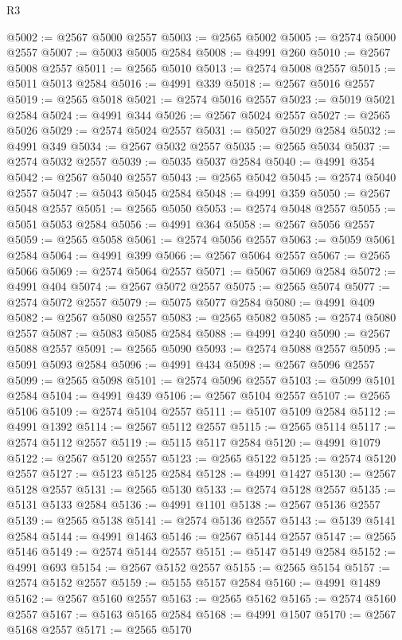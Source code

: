 \begin{lexlean}{R3}
\begin{coremodule}
@5002 := @2567 @5000 @2557
@5003 := @2565 @5002
@5005 := @2574 @5000 @2557
@5007 := @5003 @5005 @2584
@5008 := @4991 @260
@5010 := @2567 @5008 @2557
@5011 := @2565 @5010
@5013 := @2574 @5008 @2557
@5015 := @5011 @5013 @2584
@5016 := @4991 @339
@5018 := @2567 @5016 @2557
@5019 := @2565 @5018
@5021 := @2574 @5016 @2557
@5023 := @5019 @5021 @2584
@5024 := @4991 @344
@5026 := @2567 @5024 @2557
@5027 := @2565 @5026
@5029 := @2574 @5024 @2557
@5031 := @5027 @5029 @2584
@5032 := @4991 @349
@5034 := @2567 @5032 @2557
@5035 := @2565 @5034
@5037 := @2574 @5032 @2557
@5039 := @5035 @5037 @2584
@5040 := @4991 @354
@5042 := @2567 @5040 @2557
@5043 := @2565 @5042
@5045 := @2574 @5040 @2557
@5047 := @5043 @5045 @2584
@5048 := @4991 @359
@5050 := @2567 @5048 @2557
@5051 := @2565 @5050
@5053 := @2574 @5048 @2557
@5055 := @5051 @5053 @2584
@5056 := @4991 @364
@5058 := @2567 @5056 @2557
@5059 := @2565 @5058
@5061 := @2574 @5056 @2557
@5063 := @5059 @5061 @2584
@5064 := @4991 @399
@5066 := @2567 @5064 @2557
@5067 := @2565 @5066
@5069 := @2574 @5064 @2557
@5071 := @5067 @5069 @2584
@5072 := @4991 @404
@5074 := @2567 @5072 @2557
@5075 := @2565 @5074
@5077 := @2574 @5072 @2557
@5079 := @5075 @5077 @2584
@5080 := @4991 @409
@5082 := @2567 @5080 @2557
@5083 := @2565 @5082
@5085 := @2574 @5080 @2557
@5087 := @5083 @5085 @2584
@5088 := @4991 @240
@5090 := @2567 @5088 @2557
@5091 := @2565 @5090
@5093 := @2574 @5088 @2557
@5095 := @5091 @5093 @2584
@5096 := @4991 @434
@5098 := @2567 @5096 @2557
@5099 := @2565 @5098
@5101 := @2574 @5096 @2557
@5103 := @5099 @5101 @2584
@5104 := @4991 @439
@5106 := @2567 @5104 @2557
@5107 := @2565 @5106
@5109 := @2574 @5104 @2557
@5111 := @5107 @5109 @2584
@5112 := @4991 @1392
@5114 := @2567 @5112 @2557
@5115 := @2565 @5114
@5117 := @2574 @5112 @2557
@5119 := @5115 @5117 @2584
@5120 := @4991 @1079
@5122 := @2567 @5120 @2557
@5123 := @2565 @5122
@5125 := @2574 @5120 @2557
@5127 := @5123 @5125 @2584
@5128 := @4991 @1427
@5130 := @2567 @5128 @2557
@5131 := @2565 @5130
@5133 := @2574 @5128 @2557
@5135 := @5131 @5133 @2584
@5136 := @4991 @1101
@5138 := @2567 @5136 @2557
@5139 := @2565 @5138
@5141 := @2574 @5136 @2557
@5143 := @5139 @5141 @2584
@5144 := @4991 @1463
@5146 := @2567 @5144 @2557
@5147 := @2565 @5146
@5149 := @2574 @5144 @2557
@5151 := @5147 @5149 @2584
@5152 := @4991 @693
@5154 := @2567 @5152 @2557
@5155 := @2565 @5154
@5157 := @2574 @5152 @2557
@5159 := @5155 @5157 @2584
@5160 := @4991 @1489
@5162 := @2567 @5160 @2557
@5163 := @2565 @5162
@5165 := @2574 @5160 @2557
@5167 := @5163 @5165 @2584
@5168 := @4991 @1507
@5170 := @2567 @5168 @2557
@5171 := @2565 @5170

\end{coremodule}
\end{lexlean}
